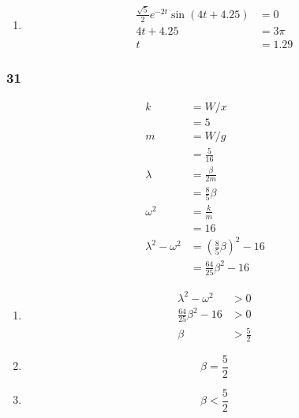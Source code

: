 \documentclass{article}
\begin{document}
\begin{enumerate}
  \item

        \begin{align*}
          \frac{\sqrt{5}}{2} e^{-2t} \sin (4t + 4.25) & = 0     \\
          4t + 4.25                                   & = 3 \pi \\
          t                                           & = 1.29
        \end{align*}
\end{enumerate}

\subsubsection{31}

\begin{align*}
  k                    & = W / x                                   \\
                       & = 5                                       \\
  m                    & = W / g                                   \\
                       & = \frac{5}{16}                            \\
  \lambda              & = \frac{\beta}{2m}                        \\
                       & = \frac{8}{5} \beta                       \\
  \omega^2             & = \frac{k}{m}                             \\
                       & = 16                                      \\
  \lambda^2 - \omega^2 & = \left( \frac{8}{5} \beta \right)^2 - 16 \\
                       & = \frac{64}{25} \beta^2 - 16
\end{align*}

\begin{enumerate}
  \item

        \begin{align*}
          \lambda^2 - \omega^2       & > 0           \\
          \frac{64}{25} \beta^2 - 16 & > 0           \\
          \beta                      & > \frac{5}{2}
        \end{align*}

  \item \[\beta = \frac{5}{2}\]

  \item \[\beta < \frac{5}{2}\]
\end{enumerate}
\end{document}
